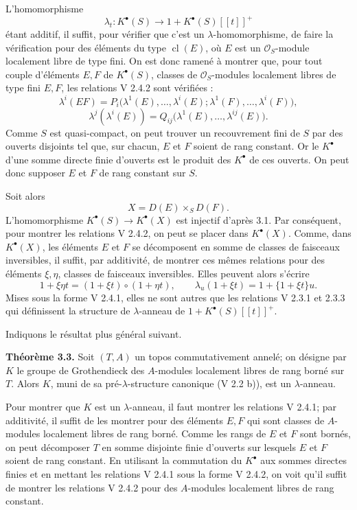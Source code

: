 \documentclass[11pt]{article}
\begin{document}
L'homomorphisme
\[
  \lambda_t:K^\bullet(S)\longrightarrow 1+K^\bullet(S)[[t]]^+
\]
étant additif, il suffit, pour vérifier que c'est un \(\lambda\)-homomorphisme, de faire la vérification pour des éléments du type \(\operatorname{cl}(E)\), où \(E\) est un \(\mathcal O_S\)-module localement libre de type fini. On est donc ramené à montrer que, pour tout couple d'éléments \(E,F\) de \(K^\bullet(S)\), classes de \(\mathcal O_S\)-modules localement libres de type fini \(E,F\), les relations V 2.4.2 sont vérifiées :
\[
 \lambda^i(EF)
 =
 P_i\bigl(\lambda^1(E),\ldots,\lambda^i(E);
          \lambda^1(F),\ldots,\lambda^i(F)\bigr),
\]
\[
 \lambda^j(\lambda^i(E))
 =
 Q_{ij}\bigl(\lambda^1(E),\ldots,\lambda^{ij}(E)\bigr).
\]
Comme \(S\) est quasi-compact, on peut trouver un recouvrement fini de \(S\) par des ouverts disjoints tel que, sur chacun, \(E\) et \(F\) soient de rang constant. Or le \(K^\bullet\) d'une somme directe finie d'ouverts est le produit des \(K^\bullet\) de ces ouverts. On peut donc supposer \(E\) et \(F\) de rang constant sur \(S\).

Soit alors
\[
  X=D(E)\times_S D(F).
\]
L'homomorphisme \(K^\bullet(S)\to K^\bullet(X)\) est injectif d'après 3.1. Par conséquent, pour montrer les relations V 2.4.2, on peut se placer dans \(K^\bullet(X)\). Comme, dans \(K^\bullet(X)\), les éléments \(E\) et \(F\) se décomposent en somme de classes de faisceaux inversibles, il suffit, par additivité, de montrer ces mêmes relations pour des éléments \(\xi,\eta\), classes de faisceaux inversibles. Elles peuvent alors s'écrire
\[
  1+\xi\eta t=(1+\xi t)\circ(1+\eta t),
  \qquad
  \lambda_u(1+\xi t)=1+\{1+\xi t\}u.
\]
Mises sous la forme V 2.4.1, elles ne sont autres que les relations V 2.3.1 et 2.3.3 qui définissent la structure de \(\lambda\)-anneau de \(1+K^\bullet(S)[[t]]^+\).

Indiquons le résultat plus général suivant.

\textbf{Théorème 3.3.} Soit \((T,A)\) un topos commutativement annelé; on désigne par \(K\) le groupe de Grothendieck des \(A\)-modules localement libres de rang borné sur \(T\). Alors \(K\), muni de sa pré-\(\lambda\)-structure canonique (V 2.2 b)), est un \(\lambda\)-anneau.

Pour montrer que \(K\) est un \(\lambda\)-anneau, il faut montrer les relations V 2.4.1; par additivité, il suffit de les montrer pour des éléments \(E,F\) qui sont classes de \(A\)-modules localement libres de rang borné. Comme les rangs de \(E\) et \(F\) sont bornés, on peut décomposer \(T\) en somme disjointe finie d'ouverts sur lesquels \(E\) et \(F\) soient de rang constant. En utilisant la commutation du \(K^\bullet\) aux sommes directes finies et en mettant les relations V 2.4.1 sous la forme V 2.4.2, on voit qu'il suffit de montrer les relations V 2.4.2 pour des \(A\)-modules localement libres de rang constant.
\end{document}
